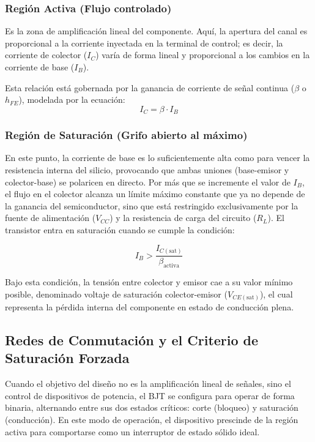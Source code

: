 \documentclass[journal]{IEEEtran}
\begin{document}
    \subsubsection{Región Activa (Flujo controlado)}
    Es la zona de amplificación lineal del componente. Aquí, la apertura del canal es proporcional a la corriente inyectada en la terminal de control; 
    es decir, la corriente de colector ($I_C$) varía de forma lineal y proporcional a los cambios en la corriente de base ($I_B$). 
    
    Esta relación está gobernada por la ganancia de corriente de señal continua ($\beta$ o $h_{FE}$), modelada por la ecuación:
    \begin{equation}
        I_C = \beta \cdot I_B
        \label{ec:region_activa}
    \end{equation}

    \subsubsection{Región de Saturación (Grifo abierto al máximo)}
    En este punto, la corriente de base es lo suficientemente alta como para vencer la resistencia interna del silicio, provocando que ambas 
    uniones (base-emisor y colector-base) se polaricen en directo. Por más que se incremente el valor de $I_B$, 
    el flujo en el colector alcanza un límite máximo constante que ya no depende de la ganancia del semiconductor, 
    sino que está restringido exclusivamente por la fuente de alimentación ($V_{CC}$) y la resistencia de carga 
    del circuito ($R_L$). El transistor entra en saturación cuando se cumple la condición:

    \begin{equation}
        I_B > \frac{I_{C(\text{sat})}}{\beta_{\text{activa}}}
        \label{ec:condicion_sat}
    \end{equation}

    Bajo esta condición, la tensión entre colector y emisor cae a su valor mínimo posible, 
    denominado voltaje de saturación colector-emisor ($V_{CE(\text{sat})}$), 
    el cual representa la pérdida interna del componente en estado de conducción plena.

    \subsection{Redes de Conmutación y el Criterio de Saturación Forzada}
    Cuando el objetivo del diseño no es la amplificación lineal de señales, sino el control de dispositivos de potencia, 
    el BJT se configura para operar de forma binaria, alternando entre sus dos estados críticos: corte (bloqueo) y saturación (conducción). 
    En este modo de operación, el dispositivo prescinde de la región activa para comportarse como un interruptor de estado sólido ideal.
        
\end{document}
